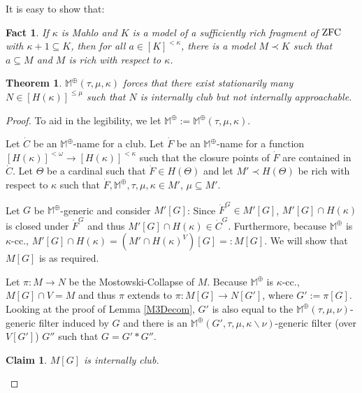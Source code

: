 \documentclass[a4paper]{amsart}
\theoremstyle{definition}
\theoremstyle{remark}
\theoremstyle{plain}
\newtheorem{mysen}[mydef]{Theorem}
\newtheorem{myfact}[mydef]{Fact}
\newtheorem{myclan}[mydef]{Claim}
\numberwithin{mydef}{section}
\newcommand{\dM}{\mathbb{M}}
\begin{document}
It is easy to show that:	 
	 
	 \begin{myfact}\label{wegotrichmodels} If $\kappa$ is Mahlo and $K$ is a model of a sufficiently rich fragment of $\textup{\textup{ZFC}}$ with $\kappa+1 \subseteq K$, then for all $a \in [K]^{<\kappa}$, there is a model $M \prec K$ such that $a \subseteq M$ and $M$ is rich with respect to $\kappa$. 
	 \end{myfact} 
	
	\begin{mysen}\label{M3ForcesDist}
		$\dM^\oplus(\tau,\mu,\kappa)$ forces that there exist stationarily many $N\in[H(\kappa)]^{\leq\mu}$ such that $N$ is internally club but not internally approachable.
	\end{mysen}
	
	\begin{proof}
		To aid in the legibility, we let $\dM^\oplus:=\dM^\oplus(\tau,\mu,\kappa)$.
		
		Let $\dot{C}$ be an $\dM^\oplus$-name for a club. Let $\dot{F}$ be an $\dM^\oplus$-name for a function $[H(\kappa)]^{<\omega}\to[H(\kappa)]^{<\kappa}$ such that the closure points of $\dot{F}$ are contained in $\dot{C}$. Let $\Theta$ be a cardinal such that $\dot{F}\in H(\Theta)$ and let $M'\prec H(\Theta)$ be rich with respect to $\kappa$ such that $\dot{F},\dM^\oplus,\tau,\mu,\kappa\in M'$, $\mu\subseteq M'$.
		


		
		Let $G$ be $\dM^\oplus$-generic and consider $M'[G]$: Since $\dot{F}^G\in M'[G]$, $M'[G]\cap H(\kappa)$ is closed under $\dot{F}^G$ and thus $M'[G]\cap H(\kappa)\in\dot{C}^G$. Furthermore, because $\dM^\oplus$ is $\kappa$-cc., $M'[G]\cap H(\kappa)=(M'\cap H(\kappa)^V)[G]=:M[G]$. We will show that $M[G]$ is as required.
		
		Let $\pi:M\to N$ be the Mostowski-Collapse of $M$. Because $\dM^\oplus$ is $\kappa$-cc., $M[G]\cap V=M$ and thus $\pi$ extends to $\pi:M[G]\to N[G']$, where $G':=\pi[G]$. Looking at the proof of Lemma \ref{M3Decom}, $G'$ is also equal to the $\dM^\oplus(\tau,\mu,\nu)$-generic filter induced by $G$ and there is an $\dM^\oplus(G',\tau,\mu,\kappa\smallsetminus\nu)$-generic filter (over $V[G']$) $G''$ such that $G=G'*G''$.
		
		
		\begin{myclan}
			$M[G]$ is internally club.
		\end{myclan}
		

\end{proof}
\end{document}
